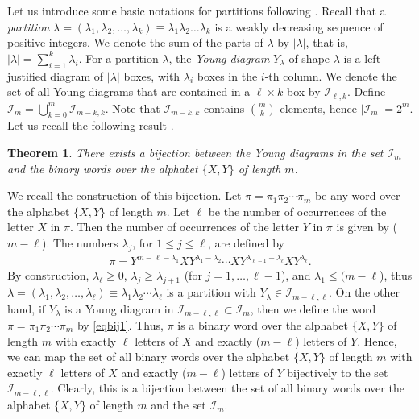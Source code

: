 \documentclass[10pt]{amsart}
\newtheorem{theorem}{Theorem}[section]%
\begin{document}
Let us introduce some basic notations for partitions following \cite{TMMS2011}. Recall that a {\em partition} $\lambda=(\lambda_1,\lambda_2,\ldots,\lambda_k) \equiv \lambda_1\lambda_2\ldots\lambda_k$ is a weakly decreasing sequence of positive integers. We denote the sum of the parts of $\lambda$ by $|\lambda|$, that is, $|\lambda|=\sum_{i=1}^k\lambda_i$. For a partition $\lambda$, the {\em Young diagram} $Y_\lambda$ of shape $\lambda$ is a left-justified diagram of $|\lambda|$ boxes, with $\lambda_i$ boxes in the $i$-th column. We denote the set of all Young diagrams that are contained in a $ \ell \times k$ box by ${\mathcal I}_{\ell,k}$. Define ${\mathcal I}_{m}=\bigcup_{k=0}^m {\mathcal I}_{m-k,k}$. Note that ${\mathcal I}_{m-k,k}$ contains $\binom{m}{k}$ elements, hence $|{\mathcal I}_m|=2^m$. Let us recall the following result \cite[Proposition 3.3]{TMMS2018}.
\begin{theorem}\label{thr1}
There exists a bijection between the Young diagrams in the set $\mathcal{I}_m$ and the binary words over the alphabet $\{X,Y\}$ of length $m$.
\end{theorem}
We recall the construction of this bijection. Let $\pi=\pi_1\pi_2\cdots\pi_m$ be any word over the alphabet $\{X,Y\}$ of length $m$. Let $\ell$ be the number of occurrences of the letter $X$ in $\pi$. Then the number of occurrences of the letter $Y$ in $\pi$ is given by ($m-\ell$). The numbers $\lambda_j$, for $1\leq j \leq \ell$, are defined by
\begin{align}\label{eqbij1}
\pi=Y^{m-\ell-\lambda_1}XY^{\lambda_1-\lambda_2}\cdots XY^{\lambda_{\ell-1}-\lambda_\ell}XY^{\lambda_\ell}.
\end{align}
By construction, $\lambda_\ell\geq 0$, $\lambda_j \geq \lambda_{j+1}$ (for $j=1,\ldots , \ell-1$), and $\lambda_1 \leq (m-\ell$), thus $\lambda=(\lambda_1,\lambda_2,\ldots,\lambda_\ell)\equiv \lambda_1\lambda_2\cdots\lambda_\ell$ is a partition with $Y_\lambda\in\mathcal{I}_{m-\ell,\ell}$. On the other hand, if $Y_\lambda$ is a Young diagram in $\mathcal{I}_{m-\ell,\ell}\subset\mathcal{I}_m$, then we define the word $\pi=\pi_1\pi_2\cdots\pi_m$ by \eqref{eqbij1}. Thus, $\pi$ is a binary word over the alphabet $\{X,Y\}$ of length $m$ with exactly $\ell$ letters of $X$ and exactly ($m-\ell$) letters of $Y$. Hence, we can map the set of all binary words over the alphabet $\{X,Y\}$ of length $m$ with exactly $\ell$ letters of $X$ and exactly ($m-\ell$) letters of $Y$ bijectively to the set $\mathcal{I}_{m-\ell,\ell}$. Clearly, this is a bijection between the set of all binary words over the alphabet $\{X,Y\}$ of length $m$ and the set $\mathcal{I}_m$.
\end{document}

